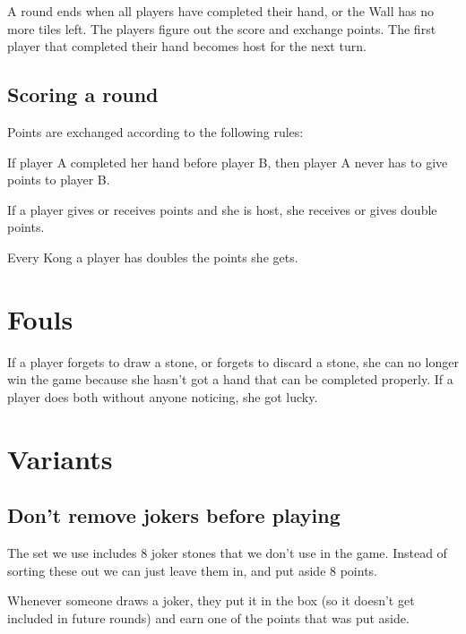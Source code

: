 \documentclass{article}
\begin{document}
A round ends when all players have completed their hand, or the Wall has no more tiles left. The players figure out the score and exchange points. The first player that completed their hand becomes host for the next turn.

\subsection{Scoring a round}
Points are exchanged according to the following rules:
\begin{itemize*}
    \item If player A completed her hand before player B, then player A never has to give points to player B.
    \item If a player gives or receives points and she is host, she receives or gives double points.
    \item Every Kong a player has doubles the points she gets.

\end{itemize*}

\section{Fouls}
If a player forgets to draw a stone, or forgets to discard a stone, she can no longer win the game because she hasn't got a hand that can be completed properly.
If a player does both without anyone noticing, she got lucky.

\section{Variants}
\subsection{Don't remove jokers before playing}
The set we use includes 8 joker stones that we don't use in the game. Instead of sorting these out we can just leave them in, and put aside 8 points.

Whenever someone draws a joker, they put it in the box (so it doesn't get included in future rounds) and earn one of the points that was put aside.

\end{document}
